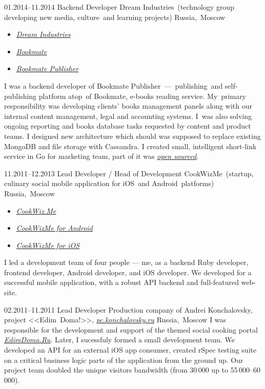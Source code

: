 \documentclass[12pt,a4paper,oneside,final]{moderncv}
\begin{document}
\cventry
{01.2014--11.2014}
{Backend Developer}
{Dream Industries~(technology group developing new media, culture~and learning projects)}
{Russia,~Moscow}
{}
{
  \begin{itemize}
    \item \underline{\href{http://dreamindustries.co/}{\itshape Dream Industries}}
    \item \underline{\href{http://bookmate.com/}{\itshape Bookmate}}
    \item \underline{\href{http://publisher.bookmate.com/}{\itshape Bookmate Publisher}}
  \end{itemize}
  \smallskip
  I was a backend developer of Bookmate Publisher~---~publishing~and self-publishing platform atop~of Bookmate, e-books reading service. My~primary responsibility was developing clients' books management panels along with our internal content management, legal and accounting systems. I~was also solving ongoing reporting and books database tasks requested by content and product teams. I designed new architecture which should was supposed to replace existing MongoDB and file storage with Cassandra. I created small, intelligent short-link service in Go for marketing team, part of it was \underline{\href{https://github.com/kavu/cappa}{\itshape open sourced}}.
}


\cventry
{11.2011--12.2013}
{Lead Developer / Head of Development}
{CookWizMe~(startup, culinary social mobile application for iOS~and Android~platforms)}
{Russia,~Moscow}{}
{
  \begin{itemize}
    \item \underline{\href{https://cookwiz.me/}{\itshape CookWiz.Me}}
    \item \underline{\href{https://play.google.com/store/apps/details?id=com.cookwizme}{\itshape CookWizMe for Android}}
    \item \underline{\href{https://itunes.apple.com/app/id605764643}{\itshape CookWizMe for iOS}}
  \end{itemize}
  I led a development team of four people — me, as a backend Ruby developer, frontend developer, Android developer, and iOS developer. We developed for a successful mobile application, with a robust API backend and full-featured web-site.
}


\cventry
{02.2011--11.2011}
{Lead Developer}
{
  Production company of Andrei Konchalovsky, project <<Edim~Doma!>>, \underline{\href{http://pc.konchalovsky.ru}{\itshape pc.konchalovsky.ru}}
}
{Russia,~Moscow}
{}
{
  I was responsible for the development and support of the themed social cooking portal \underline{\href{http://www.edimdoma.ru}{\itshape EdimDoma.Ru}}. Later, I sucessfuly formed a small development team. We developed an API for an external iOS app consumer, created rSpec testing suite on a critical business logic parts of the application from the ground up. Our project team doubled the unique visitors bandwidth (from 30\,000 up to 55\,000--60\,000).
}
\end{document}

